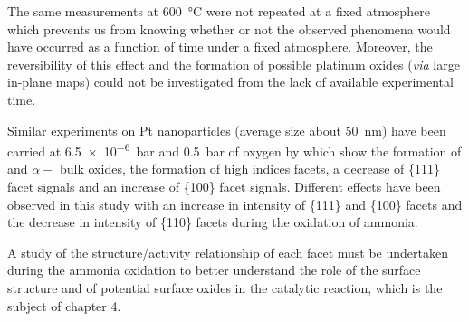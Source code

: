 The same measurements at \qty{600}{\degreeCelsius} were not repeated at a fixed atmosphere which prevents us from knowing whether or not the observed phenomena would have occurred as a function of time under a fixed atmosphere.
Moreover, the reversibility of this effect and the formation of possible platinum oxides (\textit{via} large in-plane maps) could not be investigated from the lack of available experimental time.

Similar experiments on Pt nanoparticles (average size about \qty{50}{\nm}) have been carried at \qty{6.5e-6}{\bar} and \qty{0.5}{\bar} of oxygen by \cite{Hejral2013} which show the formation of  and $\alpha-$ bulk oxides, the formation of high indices facets, a decrease of \{111\} facet signals and an increase of \{100\} facet signals.
Different effects have been observed in this study with an increase in intensity of \{111\} and \{100\} facets and the decrease in intensity of \{110\} facets during the oxidation of ammonia.

A study of the structure/activity relationship of each facet must be undertaken during the ammonia oxidation to better understand the role of the surface structure and of potential surface oxides in the catalytic reaction, which is the subject of chapter 4.